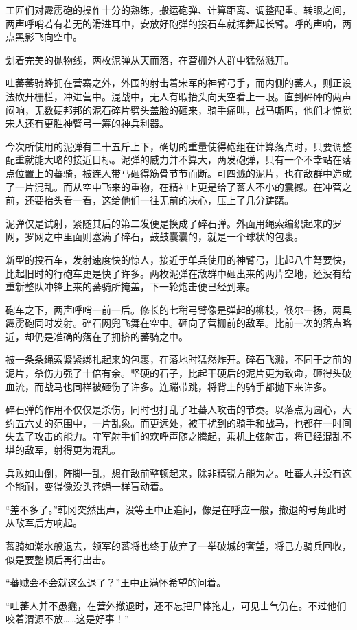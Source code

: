 工匠们对霹雳砲的操作十分的熟练，搬运砲弹、计算距离、调整配重。转眼之间，两声呼哨若有若无的滑进耳中，安放好砲弹的投石车就挥舞起长臂。呼的声响，两点黑影飞向空中。

划着完美的抛物线，两枚泥弹从天而落，在营栅外人群中猛然溅开。

吐蕃蕃骑蜂拥在营寨之外，外围的射击着宋军的神臂弓手，而内侧的蕃人，则正设法砍开栅栏，冲进营中。混战中，无人有暇抬头向天空看上一眼。直到砰砰的两声闷响，无数硬邦邦的泥石碎片劈头盖脸的砸来，骑手痛叫，战马嘶鸣，他们才惊觉宋人还有更胜神臂弓一筹的神兵利器。

今次所使用的泥弹有二十五斤上下，确切的重量使得砲组在计算落点时，只要调整配重就能大略的接近目标。泥弹的威力并不算大，两发砲弹，只有一个不幸站在落点位置上的蕃骑，被连人带马砸得筋骨节节而断。可四溅的泥片，也在敌群中造成了一片混乱。而从空中飞来的重物，在精神上更是给了蕃人不小的震撼。在冲营之前，还要抬头看一看，这给他们一往无前的决心，压上了几分踌躇。

泥弹仅是试射，紧随其后的第二发便是换成了碎石弹。外面用绳索编织起来的罗网，罗网之中里面则塞满了碎石，鼓鼓囊囊的，就是一个球状的包裹。

新型的投石车，发射速度快的惊人，接近于单兵使用的神臂弓，比起八牛弩要快，比起旧时的行砲车更是快了许多。两枚泥弹在敌群中砸出来的两片空地，还没有给重新整队冲锋上来的蕃骑所掩盖，下一轮炮击便已经到来。

砲车之下，两声呼哨一前一后。修长的七稍弓臂像是弹起的柳枝，倏尔一扬，两具霹雳砲同时发射。碎石网兜飞舞在空中。砸向了营栅前的敌军。比前一次的落点略近，却仍是准确的落在了拥挤的蕃骑之中。

被一条条绳索紧紧绑扎起来的包裹，在落地时猛然炸开。碎石飞溅，不同于之前的泥片，杀伤力强了十倍有余。坚硬的石子，比起干硬后的泥片更为致命，砸得头破血流，而战马也同样被砸伤了许多。连蹦带跳，将背上的骑手都抛下来许多。

碎石弹的作用不仅仅是杀伤，同时也打乱了吐蕃人攻击的节奏。以落点为圆心，大约五六丈的范围中，一片乱象。而更远处，被干扰到的骑手和战马，也都在一时间失去了攻击的能力。守军射手们的欢呼声随之腾起，乘机上弦射击，将已经混乱不堪的敌军，射得更为混乱。

兵败如山倒，阵脚一乱，想在敌前整顿起来，除非精锐方能为之。吐蕃人并没有这个能耐，变得像没头苍蝇一样盲动着。

“差不多了。”韩冈突然出声，没等王中正追问，像是在呼应一般，撤退的号角此时从敌军后方响起。

蕃骑如潮水般退去，领军的蕃将也终于放弃了一举破城的奢望，将己方骑兵回收，似是要整顿后再行出击。

“蕃贼会不会就这么退了？”王中正满怀希望的问着。

“吐蕃人并不愚蠢，在营外撤退时，还不忘把尸体拖走，可见士气仍在。不过他们咬着渭源不放……这是好事！”

